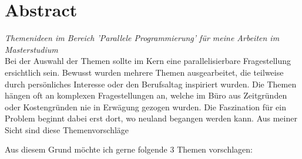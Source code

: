 \documentclass{article}
\begin{document}
\section*{Abstract}
\textit{Themenideen im Bereich 'Parallele Programmierung' für meine Arbeiten im Masterstudium} \\

Bei der Auswahl der Themen sollte im Kern eine parallelisierbare Fragestellung ersichtlich sein. Bewusst wurden mehrere Themen ausgearbeitet, die teilweise durch persönliches Interesse oder den Berufsaltag inspiriert wurden. Die Themen hängen oft an komplexen Fragestellungen an, welche im Büro aus Zeitgründen oder Kostengründen nie in Erwägung gezogen wurden. Die Faszination für ein Problem beginnt dabei erst dort, wo neuland begangen werden kann. Aus meiner Sicht sind diese Themenvorschläge 

Aus diesem Grund möchte ich gerne folgende 3 Themen vorschlagen:
\end{document}
